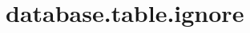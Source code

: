 \section{database.table.ignore}
\label{configuration:DatabaseTableIgnore}
\AvailableInJavaOnly{\TODO}